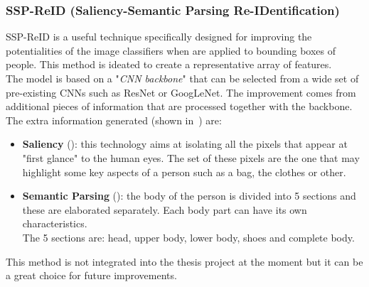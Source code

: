 \subsubsection*{SSP-ReID (Saliency-Semantic Parsing Re-IDentification)}
SSP-ReID\cite{ssp_reID} is a useful technique specifically designed for improving the potentialities of the image classifiers when are applied to bounding boxes of people. This method is ideated to create a representative array of features.\\
The model is based on a "\textit{CNN backbone}" that can be selected from a wide set of pre-existing CNNs such as ResNet or GoogLeNet. The improvement comes from additional pieces of information that are processed together with the backbone.\\
The extra information generated (shown in~) are:
\begin{itemize}
	\item \textbf{Saliency} (): this technology aims at isolating all the pixels that appear at "first glance" to the human eyes. The set of these pixels are the one that may highlight some key aspects of a person such as a bag, the clothes or other.
	\item \textbf{Semantic Parsing} (): the body of the person is divided into 5 sections and these are elaborated separately. Each body part can have its own characteristics.\\
	The 5 sections are: head, upper body, lower body, shoes and complete body.
\end{itemize}
This method is not integrated into the thesis project at the moment but it can be a great choice for future improvements.

